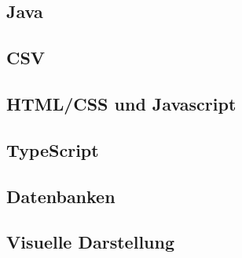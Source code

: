
\begin{spacing}{1}
    \section{Java}\label{section:allTechJava}
    \end{spacing}


\begin{spacing}{1}
    \section{CSV}\label{section:allTechCSV}
    \end{spacing}


\begin{spacing}{1}
    \section{HTML/CSS und Javascript}\label{section:allTechHTMLCSS}
    \end{spacing}

 
\begin{spacing}{1}
    \section{TypeScript}\label{section:allTechTypescript}
    \end{spacing}

 
\begin{spacing}{1}
    \section{Datenbanken}\label{section:database}
    \end{spacing}


\begin{spacing}{1}
    \section{Visuelle Darstellung}\label{section:gui}
    \end{spacing}


